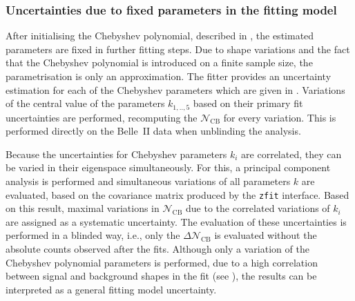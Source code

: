 \subsubsection{Uncertainties due to fixed parameters in the \texorpdfstring{\Mbc}{Mbc} fitting model}\label{sec:fitting_model_uncertainties}

After initialising the Chebyshev polynomial, described in , the estimated parameters are fixed in further fitting steps.
Due to shape variations and the fact that the Chebyshev polynomial is introduced on a finite sample size, the parametrisation is only an approximation.
The \Mbc fitter provides an uncertainty estimation for each of the Chebyshev \PDF parameters which are given in .
Variations of the central value of the parameters $k_{1,..,5}$ based on their primary fit uncertainties are performed, recomputing the $\mathcal{N}_{\mathrm{CB}}$ for every variation.
This is performed directly on the Belle~II data when unblinding the analysis.

Because the uncertainties for Chebyshev parameters $k_i$ are correlated, they can be varied in their eigenspace simultaneously.
For this, a principal component analysis is performed and simultaneous variations of all parameters $k$ are evaluated, based on the covariance matrix produced by the \texttt{zfit} interface.
Based on this result, maximal variations in $\mathcal{N}_{\mathrm{CB}}$ due to the correlated variations of $k_i$ are assigned as a systematic uncertainty.
The evaluation of these uncertainties is performed in a blinded way, i.e., only the $\Delta\mathcal{N}_{\mathrm{CB}}$ is evaluated without the absolute counts observed after the fits.
Although only a variation of the Chebyshev polynomial parameters is performed, 
due to a high correlation between signal and background \PDF shapes in the fit (see ),
the results can be interpreted as a general fitting model uncertainty.

